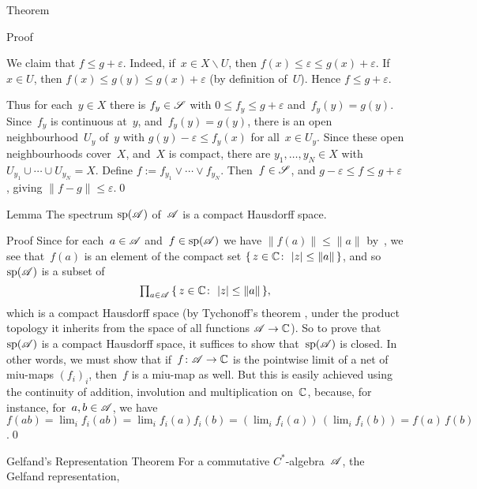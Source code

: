 \documentclass[main]{subfiles}
\begin{document}
\begin{parsec}
\begin{point}{Theorem}
\begin{point}{Proof}
\begin{point}
We claim that $f\leq g+\varepsilon$.
Indeed,
if~$x\in X\backslash U$,
then $f(x)\leq \varepsilon\leq g(x)+\varepsilon$.
If~$x\in U$,
then $f(x)\leq g(y)\leq g(x)+\varepsilon$
(by definition of~$U$).
Hence $f\leq g+\varepsilon$.
\end{point}
\begin{point}%
Thus for each~$y\in X$
there is $f_y\in \mathscr{S}$ with $0\leq f_y \leq g+\varepsilon$
and~$f_y(y)=g(y)$.
Since~$f_y$ is continuous at~$y$,
and~$f_y(y)=g(y)$,
there is an open neighbourhood~$U_y$ of~$y$
with $g(y)-\varepsilon\leq f_y(x)$
for all~$x\in U_y$.
Since these open neighbourhoods cover~$X$,
and~$X$ is compact,
there are $y_1,\dotsc,y_N\in X$
with $U_{y_1}\cup\dotsb\cup U_{y_N} = X$.
Define $f:=f_{y_1}\vee \dotsb\vee f_{y_N}$.
Then~$f\in\mathscr{S}$,
and $g-\varepsilon \leq f\leq g+\varepsilon$,
giving $\|f-g\|\leq \varepsilon$.\qed
\end{point}
\end{point}
\end{point}
\begin{point}{Lemma}%
The spectrum $\mathrm{sp}(\mathscr{A})$ of~$\mathscr{A}$ is a compact Hausdorff space.
\begin{point}{Proof}%
Since for each~$a\in \mathscr{A}$
and~$f\in \mathrm{sp}(\mathscr{A})$
we have  $\|f(a)\|\leq \|a\|$ 
by~\TODO{},
we see that~$f(a)$ is an element of the compact set
$\{\,z\in \mathbb{C}\colon\, \left|z\right|\leq\|a\|\,\}$,
and so~$\mathrm{sp}(\mathscr{A})$ is a subset of
\begin{equation*}
\textstyle
\prod_{a\in \mathscr{A}}\, \{\,z\in \mathbb{C}\colon\, \left|z\right|\leq \|a\|\,\},
\end{equation*}
which is a compact Hausdorff space
(by Tychonoff's theorem , under the product topology
it inherits
from the space of all functions $\mathscr{A}\to \mathbb{C}$).
So to prove that~$\mathrm{sp}(\mathscr{A})$
is a compact Hausdorff space,
it suffices to show that~$\mathrm{sp}(\mathscr{A})$
is closed.
In other words,
we must show that if~$f\colon \mathscr{A}\to \mathbb{C}$
is the pointwise limit of a net of miu-maps $(f_i)_i$,
then~$f$ is a miu-map as well.
But this is easily achieved
using the continuity of addition, involution and multiplication on~$\mathbb{C}$,
because, for instance, 
for~$a,b\in\mathscr{A}$, we have $f(ab)
= \lim_i f_i(ab)=\lim_i f_i(a)f_i(b)
 = (\lim_i f_i(a))\,(\lim_i f_i(b))
= f(a) \,f(b)$.\qed
\end{point}
\end{point}
\begin{point}[gelfand]{Gelfand's Representation Theorem}%
For a commutative $C^*$-algebra~$\mathscr{A}$,
the Gelfand representation, 

\end{point}
\end{parsec}
\end{document}
